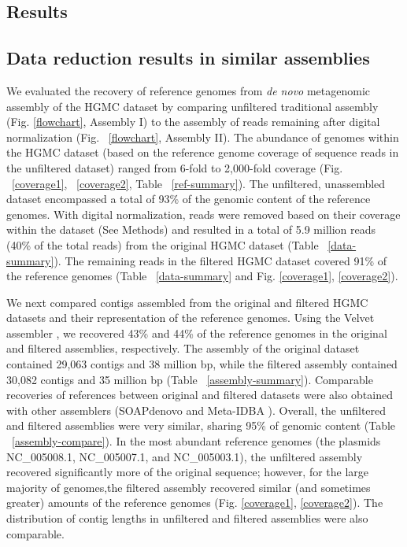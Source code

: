 \documentclass{pnastwo}
\begin{document}
\begin{article}
\section*{Results} \subsection*{Data reduction results in similar assemblies} We
evaluated the recovery of reference genomes from {\em de novo} metagenomic
assembly of the HGMC dataset by comparing unfiltered traditional assembly (Fig.
\ref{flowchart}, Assembly I) to the assembly of reads remaining after digital
normalization (Fig. ~\ref{flowchart}, Assembly II). The
abundance of genomes within the HGMC dataset (based on the reference genome
coverage of sequence reads in the unfiltered dataset) ranged from 6-fold to
2,000-fold coverage (Fig. ~\ref{coverage1}, ~\ref{coverage2}, Table ~\ref{ref-summary}). The unfiltered, unassembled dataset
encompassed a total of 93\% of the genomic content of the reference genomes.
With digital normalization, reads were removed based on their coverage within
the dataset (See Methods) and resulted in a total of 5.9 million reads (40\% of
the total reads) from the original HGMC dataset (Table ~\ref{data-summary}). The
remaining reads in the filtered HGMC dataset covered 91\% of the reference
genomes (Table ~\ref{data-summary} and Fig.  \ref{coverage1}, \ref{coverage2}).

We next compared contigs assembled from the original and filtered HGMC datasets
and their representation of the reference genomes. Using the Velvet assembler
\cite{Zerbino:2008p665}, we recovered 43\% and 44\% of the reference genomes in
the original and filtered assemblies, respectively. The assembly of the original
dataset contained 29,063 contigs and 38 million bp, while the filtered assembly
contained 30,082 contigs and 35 million bp (Table ~\ref{assembly-summary}).
Comparable recoveries of references between original and filtered datasets were
also obtained with other assemblers (SOAPdenovo \cite{Li:2010jz} and Meta-IDBA
\cite{Peng:2011p898}). Overall, the unfiltered and filtered assemblies were very
similar, sharing 95\% of genomic content (Table ~\ref{assembly-compare}). In the most abundant reference genomes
(the plasmids NC\_005008.1, NC\_005007.1, and NC\_005003.1), the unfiltered
assembly recovered significantly more of the original sequence; however, for the
large majority of genomes,the filtered assembly recovered similar (and sometimes
greater) amounts of the reference genomes (Fig. \ref{coverage1}, \ref{coverage2}). The distribution
of contig lengths in unfiltered and filtered assemblies were also comparable.


\end{article}
\end{document}
